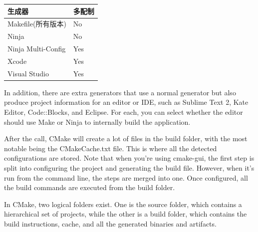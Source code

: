 \begin{table}[H]
	\centering
	\begin{tabular}{|l|l|}
		\hline
		\textbf{生成器}                                                                                                                  &  \textbf{多配制}                                                            \\ \hline
		Makefile(所有版本)                                                                                                                                  &                                                                           No       \\  \hline
		Ninja              &                                                                                  No\\  \hline
		Ninja Multi-Config  &  Yes                                                                                \\ \hline
    Xcode              &                                                                                  Yes\\  \hline
    Visual Studio              &                                                                                  Yes\\  \hline
	\end{tabular}
\end{table}

In addition, there are extra generators that use a normal generator but also produce project information for an editor or IDE, such as Sublime Text 2, Kate Editor, Code::Blocks, and Eclipse. For each, you can select whether the editor should use Make or Ninja to internally build the application.

After the call, CMake will create a lot of files in the build folder, with the most notable being the CMakeCache.txt file. This is where all the detected configurations are stored. Note that when you're using cmake-gui, the first step is split into configuring the project and generating the build file. However, when it's run from the command line, the steps are merged into one. Once configured, all the build commands are executed from the build folder.


In CMake, two logical folders exist. One is the source folder, which contains a hierarchical set of projects, while the other is a build folder, which contains the build instructions, cache, and all the generated binaries and artifacts.

